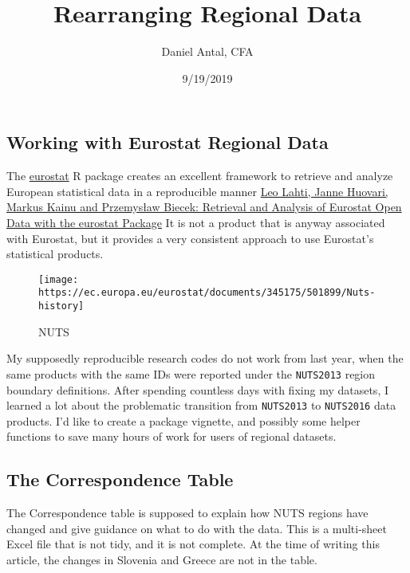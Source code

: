 \documentclass[]{article}
\title{Rearranging Regional Data}
\author{Daniel Antal, CFA}
\date{9/19/2019}
\begin{document}
\maketitle

\hypertarget{working-with-eurostat-regional-data}{%
\subsection{Working with Eurostat Regional
Data}\label{working-with-eurostat-regional-data}}

The \href{http://ropengov.github.io/eurostat/}{eurostat} R package
creates an excellent framework to retrieve and analyze European
statistical data in a reproducible manner
\href{https://journal.r-project.org/archive/2017/RJ-2017-019/RJ-2017-019.pdf}{Leo
Lahti, Janne Huovari, Markus Kainu and Przemysław Biecek: Retrieval and
Analysis of Eurostat Open Data with the eurostat Package} It is not a
product that is anyway associated with Eurostat, but it provides a very
consistent approach to use Eurostat's statistical products.

\begin{figure}
\centering
\texttt{[image: https://ec.europa.eu/eurostat/documents/345175/501899/Nuts-history]}
\caption{NUTS}
\end{figure}

My supposedly reproducible research codes do not work from last year,
when the same products with the same IDs were reported under the
\texttt{NUTS2013} region boundary definitions. After spending countless
days with fixing my datasets, I learned a lot about the problematic
transition from \texttt{NUTS2013} to \texttt{NUTS2016} data products.
I'd like to create a package vignette, and possibly some helper
functions to save many hours of work for users of regional datasets.

\hypertarget{the-correspondence-table}{%
\subsection{The Correspondence Table}\label{the-correspondence-table}}

The Correspondence table is supposed to explain how NUTS regions have
changed and give guidance on what to do with the data. This is a
multi-sheet Excel file that is not tidy, and it is not complete. At the
time of writing this article, the changes in Slovenia and Greece are not
in the table.
\end{document}
